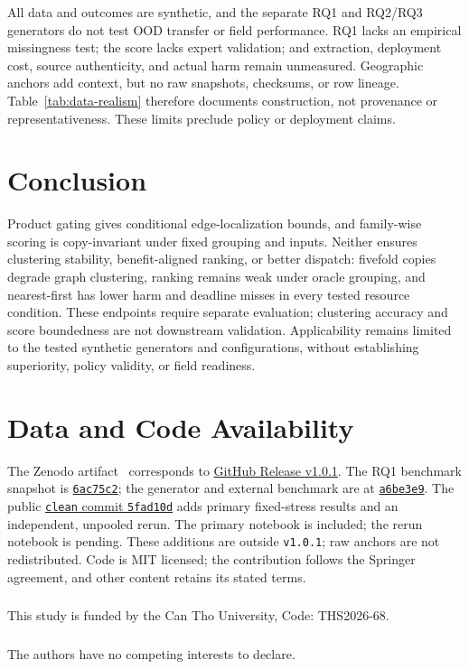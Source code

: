 \documentclass[runningheads]{llncs}
\begin{document}
All data and outcomes are synthetic, and the separate RQ1 and RQ2/RQ3
generators do not test OOD transfer or field performance. RQ1 lacks an
empirical missingness test; the score lacks expert validation; and extraction,
deployment cost, source authenticity, and actual harm remain unmeasured.
Geographic anchors add context, but no raw snapshots, checksums, or row
lineage. Table~\ref{tab:data-realism} therefore documents construction, not
provenance or representativeness. These limits preclude policy or deployment
claims.

\section{Conclusion}

Product gating gives conditional edge-localization bounds, and family-wise
scoring is copy-invariant under fixed grouping and inputs. Neither ensures
clustering stability, benefit-aligned ranking, or better dispatch: fivefold
copies degrade graph clustering, ranking remains weak under oracle grouping,
and nearest-first has lower harm and deadline misses in every tested resource
condition. These endpoints require separate evaluation; clustering accuracy
and score boundedness are not downstream validation. Applicability remains
limited to the tested synthetic generators and configurations, without
establishing superiority, policy validity, or field readiness.

\section*{Data and Code Availability}

The Zenodo artifact~\cite{nguyen2026floodartifact} corresponds to
\href{https://github.com/ngthtrong/nckh2/releases/tag/v1.0.1}{GitHub Release
v1.0.1}. The RQ1 benchmark snapshot is
\href{https://github.com/ngthtrong/nckh2/commit/6ac75c202d04934deb46d84486132e54d42d735f}{\texttt{6ac75c2}};
the generator and external benchmark are at
\href{https://github.com/ngthtrong/nckh2/commit/a6be3e988dad1aa442c8c8e158c2bba96b2b7fb9}{\texttt{a6be3e9}}.
The public \href{https://github.com/ngthtrong/nckh2/tree/5fad10ddbe6e899769b59fe774850a41d2ac8d7d}{\texttt{clean} commit
\texttt{5fad10d}} adds primary fixed-stress results and an independent,
unpooled rerun. The primary notebook is included; the rerun notebook is
pending. These additions are outside \texttt{v1.0.1}; raw anchors are not
redistributed. Code is MIT licensed; the contribution follows the Springer
agreement, and other content retains its stated terms.

\begin{credits}
\subsubsection{\ackname} This study is funded by the Can Tho University, Code:
THS2026-68.

\subsubsection{\discintname} The authors have no competing interests to declare.
\end{credits}



\end{document}
